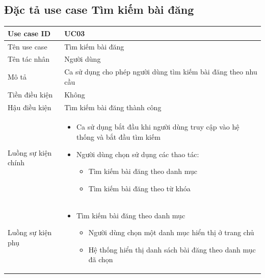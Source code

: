 \documentclass[../DoAn.tex]{subfiles}
\begin{document}
\subsection{Đặc tả use case Tìm kiếm bài đăng}
\hfill
\begin{table}[H]
\begin{tabular}{|p{3cm}|p{12cm}|}
\hline
Use case ID         & UC03                                                                                                               \\ \hline
Tên use case        & Tìm kiếm bài đăng                                                                                                   \\ \hline
Tên tác nhân        & Người dùng                                                                                                         \\ \hline
Mô tả               & Ca sử dụng cho phép người dùng tìm kiếm bài đăng theo nhu cầu\\ \hline
Tiền điều kiện      & Không                                                                                                              \\ \hline
Hậu điều kiện       & Tìm kiếm bài đăng thành công                                                                                                              \\ \hline
Luồng sự kiện chính & 
\begin{itemize}
\item Ca sử dụng bắt đầu khi người dùng truy cập vào hệ thống và bắt đầu tìm kiếm
\item Người dùng chọn sử dụng các thao tác:
\begin{itemize}
\item Tìm kiếm bài đăng theo danh mục
\item Tìm kiếm bài đăng theo từ khóa
\end{itemize}
\end{itemize} \\\hline
Luồng sự kiện phụ   &                                      \begin{itemize}
\item Tìm kiếm bài đăng theo danh mục
\begin{itemize}
\item Người dùng chọn một danh mục hiển thị ở trang chủ
\item Hệ thống hiển thị danh sách bài đăng theo danh mục đã chọn
\end{itemize}

\end{itemize}
\end{tabular}
\end{table}
\end{document}
